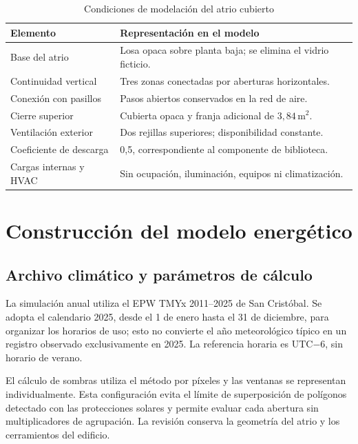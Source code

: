 \begin{table}[H]
\centering
\caption{Condiciones de modelación del atrio cubierto}
\label{tab:db-atrio}
{\small\renewcommand{\arraystretch}{1.15}
\begin{tabular}{p{4cm}p{9cm}}
\toprule
Elemento & Representación en el modelo \\
\midrule
Base del atrio & Losa opaca sobre planta baja; se elimina el vidrio ficticio. \\
Continuidad vertical & Tres zonas conectadas por aberturas horizontales. \\
Conexión con pasillos & Pasos abiertos conservados en la red de aire. \\
Cierre superior & Cubierta opaca y franja adicional de $3,84\,\mathrm{m^2}$. \\
Ventilación exterior & Dos rejillas superiores; disponibilidad constante. \\
Coeficiente de descarga & 0,5, correspondiente al componente de biblioteca. \\
Cargas internas y HVAC & Sin ocupación, iluminación, equipos ni climatización. \\
\bottomrule
\end{tabular}}
\end{table}

\par\medskip
\section{Construcción del modelo energético}
\subsection{Archivo climático y parámetros de cálculo}
\begin{textoDosTercios}
La simulación anual utiliza el EPW TMYx 2011--2025 de San Cristóbal. Se adopta el calendario 2025, desde el 1 de enero hasta el 31 de diciembre, para organizar los horarios de uso; esto no convierte el año meteorológico típico en un registro observado exclusivamente en 2025. La referencia horaria es UTC$-6$, sin horario de verano.

El cálculo de sombras utiliza el método por píxeles y las ventanas se representan individualmente. Esta configuración evita el límite de superposición de polígonos detectado con las protecciones solares y permite evaluar cada abertura sin multiplicadores de agrupación. La revisión conserva la geometría del atrio y los cerramientos del edificio.
\end{textoDosTercios}


